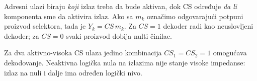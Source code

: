 Adresni ulazi biraju \emph{koji} izlaz treba da bude aktivan, dok CS određuje
\emph{da li} komponenta sme da aktivira izlaz. Ako sa \(m_k\) označimo odgovarajući
potpuni proizvod selektora, tada je \(Y_k=CS\,m_k\).
Za \(CS=1\) dekoder radi kao neuslovljeni dekoder; za \(CS=0\) svaki proizvod dobija nulti činilac.

Za dva aktivno-visoka CS ulaza jedino kombinacija \(CS_1=CS_2=1\) omogućava dekodovanje.
Neaktivna logička nula na izlazima nije stanje visoke impedanse:
izlaz na nuli i dalje ima određen logički nivo.

